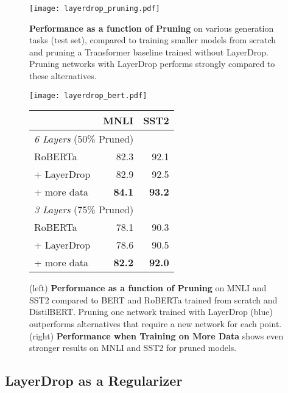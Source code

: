 \begin{figure}[t]
    \centering
    \texttt{[image: layerdrop\_pruning.pdf]}
    \caption{\textbf{Performance as a function of Pruning} on various generation tasks (test set), compared to training smaller models from scratch and pruning a Transformer baseline trained without LayerDrop. Pruning networks with LayerDrop performs strongly compared to these alternatives.
}
    \label{fig:ablation_1}
\end{figure}

\begin{figure}[t]
\begin{minipage}[t]{0.67\linewidth}
    \vspace{0pt}
    \centering
    \texttt{[image: layerdrop\_bert.pdf]}
    \label{fig:ablation_pruning}
\end{minipage}
\hfill
\begin{minipage}[t]{0.32\linewidth}
    \vspace{17pt}
    \centering
    \footnotesize
    \begin{tabular}{lrr}
        \toprule
         & MNLI & SST2 \\
        \midrule
        \multicolumn{2}{l}{\textit{6 Layers} (50\% Pruned)} \\
        RoBERTa & 82.3 & 92.1\\
        + LayerDrop & 82.9 & 92.5 \\
        + more data & \bf 84.1 & \bf 93.2 \\
        \midrule
        \multicolumn{2}{l}{\textit{3 Layers} (75\% Pruned)} \\
        RoBERTa & 78.1 & 90.3 \\
        + LayerDrop & 78.6 & 90.5 \\
        + more data & \bf 82.2 & \bf 92.0\\
        \bottomrule
    \end{tabular}
    \label{tbl:test}
\end{minipage}
    \caption{(left) \textbf{Performance as a function of Pruning} on MNLI and SST2 compared to BERT and RoBERTa trained from scratch and DistilBERT. Pruning one network trained with LayerDrop (blue) outperforms alternatives that require a new network for each point. (right) \textbf{Performance when Training on More Data} shows even stronger results on MNLI and SST2 for pruned models.}
\end{figure}


\subsection{LayerDrop as a Regularizer}

